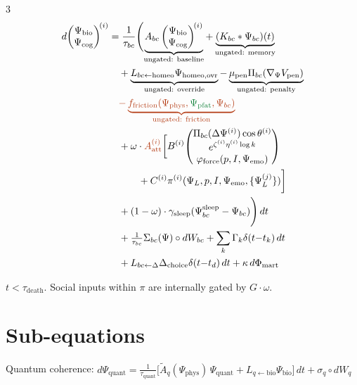 \documentclass[8pt,landscape]{extarticle}
\newcommand{\fix}[1]{\textcolor{fixcolor}{#1}}
\newcommand{\vnew}[1]{\textcolor{v13color}{#1}}
\newcommand{\vfour}[1]{\textcolor{v14color}{#1}}
\begin{document}
\begin{multicols}{3}
\begin{align*}
d\!\begin{pmatrix}\Psi_{\mathrm{bio}} \\ \Psi_{\mathrm{cog}}\end{pmatrix}^{\!(i)} &= \frac{1}{\tau_{bc}}\Biggl(
\underbrace{A_{bc}\begin{pmatrix}\Psi_{\mathrm{bio}} \\ \Psi_{\mathrm{cog}}\end{pmatrix}^{\!(i)}}_{\text{ungated: baseline}}
+ \underbrace{(K_{bc} * \Psi_{bc})(t)}_{\text{ungated: memory}} \\
&\quad + \underbrace{L_{bc\leftarrow\mathrm{homeo}}\Psi_{\mathrm{homeo,ovr}}}_{\text{ungated: override}}
- \underbrace{\mu_{\mathrm{pen}}\Pi_{bc}(\nabla_\Psi V_{\mathrm{pen}})}_{\text{ungated: penalty}} \\
&\quad \vnew{- \underbrace{f_{\mathrm{friction}}(\Psi_{\mathrm{phys}}, \vfour{\Psi_{\mathrm{pfat}}}, \Psi_{bc})}_{\text{ungated: friction}}} \\
&\quad + \omega \cdot \vnew{A_{\mathrm{att}}^{(i)}} \biggl[B^{(i)}\!\begin{pmatrix}\Pi_{bc}(\Delta\Psi^{(i)})\cos\theta^{(i)} \\ e^{\zeta^{(i)}\eta^{(i)}\log k} \\ \varphi_{\mathrm{force}}(p, I, \Psi_{\mathrm{emo}})\end{pmatrix} \\
&\qquad\quad + C^{(i)}\pi^{(i)}(\Psi_L, p, I, \Psi_{\mathrm{emo}}, \{\Psi^{(j)}_L\})\biggr] \\
&\quad + (1-\omega)\cdot\gamma_{\mathrm{sleep}}(\Psi^{\mathrm{sleep}}_{bc} - \Psi_{bc})
\Biggr)\,dt \\
&\quad + \tfrac{1}{\tau_{bc}}\Sigma_{bc}(\Psi) \circ dW_{bc}
+ \sum_k \Gamma_k\delta(t{-}t_k)\,dt \\
&\quad + L_{bc\leftarrow\Delta}\Delta_{\mathrm{choice}}\delta(t{-}t_d)\,dt
+ \kappa\,d\Phi_{\mathrm{mart}}
\end{align*}

$t < \tau_{\mathrm{death}}$. Social inputs within $\pi$ are internally gated by $G\cdot\omega$.

\section*{Sub-equations}

\fix{Quantum coherence:}
$d\Psi_{\mathrm{quant}} = \frac{1}{\tau_{\mathrm{quant}}}\bigl[\tilde{A}_q(\Psi_{\mathrm{phys}})\,\Psi_{\mathrm{quant}} + L_{q\leftarrow\mathrm{bio}}\Psi_{\mathrm{bio}}\bigr]\,dt + \sigma_q \circ dW_q$


\end{multicols}
\end{document}
